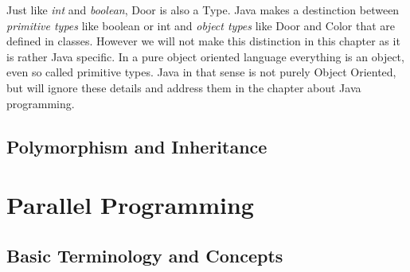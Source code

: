 \documentclass{scrreprt}
\begin{document}
Just like \textit{int} and \textit{boolean}, Door is also a Type. Java makes a destinction between \textit{primitive types} like boolean or int and \textit{object types} like Door and Color that are defined in classes. However we will not make this distinction in this chapter as it is rather Java specific. In a pure object oriented language everything is an object, even so called primitive types. Java in that sense is not purely Object Oriented, but will ignore these details and address them in the chapter about Java programming. \\

\section{Polymorphism and Inheritance}



\chapter{Parallel Programming}

\section{Basic Terminology and Concepts}
\end{document}
